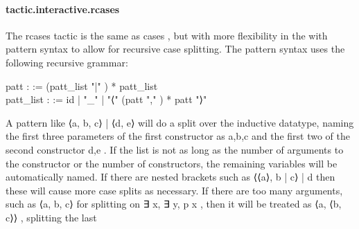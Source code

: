 \documentclass{article}
\begin{document}
\paragraph{tactic.interactive.rcases}
\par
The 
\colorbox[RGB]{253,246,227}{{{{\color[RGB]{101, 123, 131} rcases }}}} tactic is the same as 
\colorbox[RGB]{253,246,227}{{{{\color[RGB]{101, 123, 131} cases }}}}, but with more flexibility in the
\colorbox[RGB]{253,246,227}{{{{\color[RGB]{133, 153, 0} with }}}} pattern syntax to allow for recursive case splitting. The pattern syntax
uses the following recursive grammar:
\\
\colorbox[RGB]{253,246,227}{\parbox{4.5in}{{{{\color[RGB]{101, 123, 131} patt : }}}{{{\color[RGB]{181, 137, 0} := }}}{{{\color[RGB]{101, 123, 131}  (patt\_list  }}}{{{\color[RGB]{42, 161, 152} "|" }}}{{{\color[RGB]{101, 123, 131} ) }}}{{{\color[RGB]{181, 137, 0} * }}}{{{\color[RGB]{101, 123, 131}  patt\_list
 }}}\\
{{{\color[RGB]{101, 123, 131} patt\_list : }}}{{{\color[RGB]{181, 137, 0} := }}}{{{\color[RGB]{101, 123, 131}  id |  }}}{{{\color[RGB]{42, 161, 152} "\_" }}}{{{\color[RGB]{101, 123, 131}  |  }}}{{{\color[RGB]{42, 161, 152} "⟨" }}}{{{\color[RGB]{101, 123, 131}  (patt  }}}{{{\color[RGB]{42, 161, 152} "," }}}{{{\color[RGB]{101, 123, 131} ) }}}{{{\color[RGB]{181, 137, 0} * }}}{{{\color[RGB]{101, 123, 131}  patt  }}}{{{\color[RGB]{42, 161, 152} "⟩" }}}{{{\color[RGB]{101, 123, 131} 
 }}}\\

}}\par
A pattern like 
\colorbox[RGB]{253,246,227}{{{{\color[RGB]{101, 123, 131} ⟨a, b, c⟩ | ⟨d, e⟩ }}}} will do a split over the inductive datatype,
naming the first three parameters of the first constructor as 
\colorbox[RGB]{253,246,227}{{{{\color[RGB]{101, 123, 131} a,b,c }}}} and the
first two of the second constructor 
\colorbox[RGB]{253,246,227}{{{{\color[RGB]{101, 123, 131} d,e }}}}. If the list is not as long as the
number of arguments to the constructor or the number of constructors, the
remaining variables will be automatically named. If there are nested brackets
such as 
\colorbox[RGB]{253,246,227}{{{{\color[RGB]{101, 123, 131} ⟨⟨a⟩, b | c⟩ | d }}}} then these will cause more case splits as necessary.
If there are too many arguments, such as 
\colorbox[RGB]{253,246,227}{{{{\color[RGB]{101, 123, 131} ⟨a, b, c⟩ }}}} for splitting on
\colorbox[RGB]{253,246,227}{{{{\color[RGB]{101, 123, 131} ∃ x, ∃ y, p x }}}}, then it will be treated as 
\colorbox[RGB]{253,246,227}{{{{\color[RGB]{101, 123, 131} ⟨a, ⟨b, c⟩⟩ }}}}, splitting the last
\end{document}
